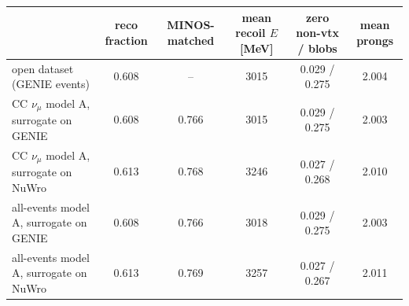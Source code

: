 \begin{tabular}{lccccc}
\toprule
 & reco fraction & MINOS-matched & mean recoil $E$ [MeV] & zero non-vtx / blobs & mean prongs \\
\midrule
open dataset (GENIE events) & 0.608 & -- & 3015 & 0.029 / 0.275 & 2.004 \\
\midrule
CC $\nu_\mu$ model A, surrogate on GENIE & 0.608 & 0.766 & 3015 & 0.029 / 0.275 & 2.003 \\
CC $\nu_\mu$ model A, surrogate on NuWro & 0.613 & 0.768 & 3246 & 0.027 / 0.268 & 2.010 \\
all-events model A, surrogate on GENIE & 0.608 & 0.766 & 3018 & 0.029 / 0.275 & 2.003 \\
all-events model A, surrogate on NuWro & 0.613 & 0.769 & 3257 & 0.027 / 0.267 & 2.011 \\
\bottomrule
\end{tabular}
